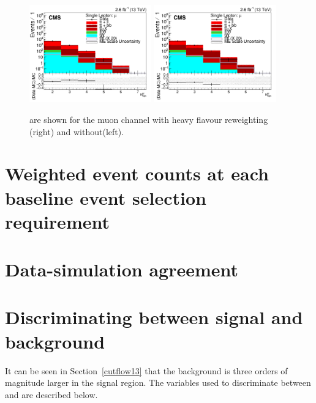 \begin{figure}[ht!]
    \includegraphics[width=0.47\textwidth]{images/Run2/nMtags_StackLogY_HF_wo_reweight.pdf} 
    \includegraphics[width=0.47\textwidth]{images/Run2/nMtags_StackLogY_HF_w_reweight.pdf} 
    \caption{\nMtags are shown for the muon channel with heavy flavour reweighting (right) and without(left).}
    \label{fig:HF_reweight}
\end{figure}

\section{Weighted event counts at each baseline event selection requirement \label{cutflow13}}

\section{Data-simulation agreement}

\section{Discriminating between signal and background}
\label{sec:discriminating13}

It can be seen in Section~\ref{cutflow13} that the \ttbar background is three orders of magnitude larger in the signal region. The variables used to discriminate between \ttbar and \tttt are described below.

